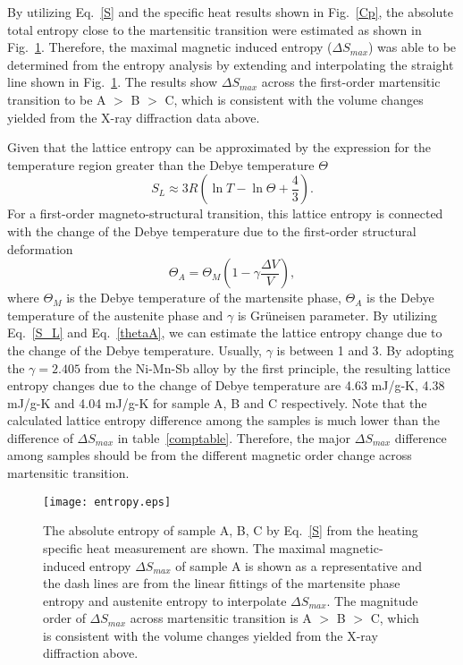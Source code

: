 \documentclass[sort&compress,twocolumn,3p]{elsarticle}
\begin{document}
By utilizing Eq.~\ref{S} and the specific heat results shown in Fig.~\ref{Cp}, the absolute total entropy close to the martensitic transition were estimated as shown in Fig.~\ref{hysteresis}.
Therefore, the maximal magnetic induced entropy ($\Delta S_{max}$) was able to be determined from the entropy analysis by extending and interpolating the straight line shown in Fig.~\ref{hysteresis}.
The results show $\Delta S_{max}$ across the first-order martensitic transition to be A $>$ B $>$ C, which is consistent with the volume changes yielded from the X-ray diffraction data above.

Given that the lattice entropy can be approximated by the expression for the temperature region greater than the Debye temperature $\Theta$\cite{PhysRevB.71.054410}
\begin{equation}
S_L\approx3R\left(\ln T -\ln \Theta + \frac{4}{3}\right).
\label{S_L}
\end{equation}
For a first-order magneto-structural transition, this lattice entropy is connected with the change of the Debye temperature due to the first-order structural deformation\cite{PhysRevB.71.054410,doi:10.1063/1.2201879,doi:10.1063/1.3257381}
\begin{equation}
\Theta_A=\Theta_M\left(1-\gamma\frac{\Delta V}{V} \right),
\label{thetaA}
\end{equation}
where $\Theta_M$ is the Debye temperature of the martensite phase, $\Theta_A$ is the Debye temperature of the austenite phase and $\gamma$ is Gr\"{u}neisen parameter.
By utilizing Eq.~\ref{S_L} and Eq.~\ref{thetaA}, we can estimate the lattice entropy change due to the change of the Debye temperature.
Usually, $\gamma$ is between 1 and 3\cite{kittel2004introduction}.
By adopting the $\gamma=2.405$ from the Ni-Mn-Sb alloy by the first principle\cite{PUGACZOWAMICHALSKA2006251}, the resulting lattice entropy changes due to the change of Debye temperature are 4.63 mJ/g-K, 4.38 mJ/g-K and 4.04 mJ/g-K for sample A, B and C respectively.
Note that the calculated lattice entropy difference among the samples is much lower than the difference of $\Delta S_{max}$ in table~\ref{comptable}.
Therefore, the major $\Delta S_{max}$ difference among samples should be from the different magnetic order change across martensitic transition.

\begin{figure}
\texttt{[image: entropy.eps]}
\caption{The absolute entropy of sample A, B, C by Eq.~\ref{S} from the heating specific heat measurement are shown.
		The maximal magnetic-induced entropy $\Delta S_{max}$ of sample A is shown as a representative and the dash lines are from the linear fittings of the martensite phase entropy and austenite entropy to interpolate $\Delta S_{max}$.
		The magnitude order of $\Delta S_{max}$ across martensitic transition is A $>$ B $>$ C, which is consistent with the volume changes yielded from the X-ray diffraction above.}
\label{hysteresis}
\end{figure}
\end{document}

